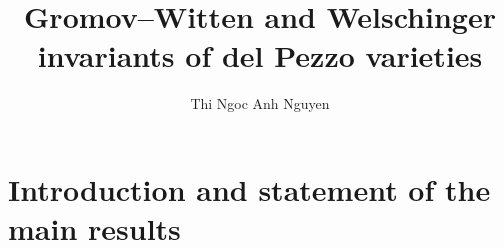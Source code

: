 \documentclass[11pt]{amsart}
\title{Gromov--Witten and Welschinger invariants of del Pezzo varieties}
\author{Thi Ngoc Anh Nguyen}
\numberwithin{equation}{section}
\theoremstyle{definition}
\theoremstyle{plain}
\theoremstyle{remark}
\begin{document}


\maketitle


\begin{prelims}

\DisplayAbstractInEnglish

\bigskip

\DisplayKeyWords

\medskip

\DisplayMSCclass

\end{prelims}



\newpage

\setcounter{tocdepth}{1}

\tableofcontents




\section{Introduction and statement of the main results} \label{intro}
\end{document}
